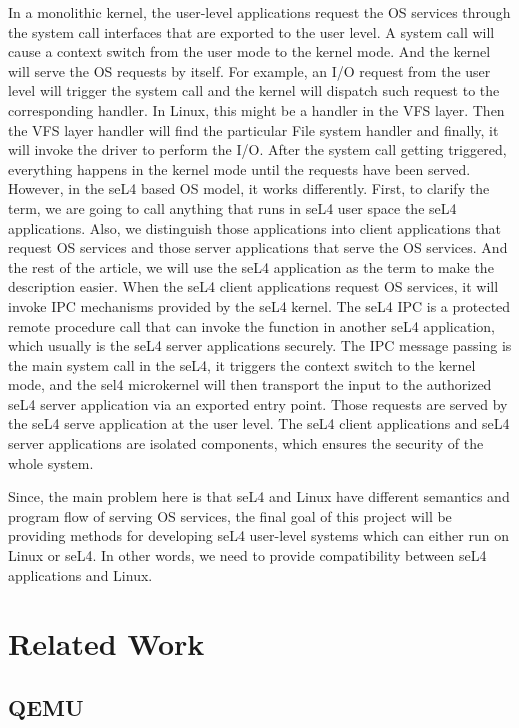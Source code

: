 In a monolithic kernel, the user-level applications request the OS services through the system call interfaces that are exported to the user level. A system call will cause a context switch from the user mode to the kernel mode. And the kernel will serve the OS requests by itself. For example, an I/O request from the user level will trigger the system call and the kernel will dispatch such request to the corresponding handler. In Linux, this might be a handler in the VFS layer. Then the VFS layer handler will find the particular File system handler and finally, it will invoke the driver to perform the I/O. After the system call getting triggered, everything happens in the kernel mode until the requests have been served. However, in the seL4 based OS model, it works differently. First, to clarify the term, we are going to call anything that runs in seL4 user space the seL4 applications. Also, we distinguish those applications into client applications that request OS  services and those server applications that serve the OS services. And the rest of the article, we will use the seL4 application as the term to make the description easier. When the seL4 client applications request OS services, it will invoke IPC mechanisms provided by the seL4 kernel. The seL4 IPC is a protected remote procedure call that can invoke the function in another seL4 application, which usually is the seL4 server applications securely. The IPC message passing is the main system call in the seL4, it triggers the context switch to the kernel mode, and the sel4 microkernel will then transport the input to the authorized seL4 server application via an exported entry point. Those requests are served by the seL4 serve application at the user level.
The seL4 client applications and seL4 server applications are isolated components, which ensures the security of the whole system.

Since, the main problem here is that seL4 and Linux have different semantics and program flow of serving OS services, the final goal of this project will be providing methods for developing seL4 user-level systems which can either run on Linux or seL4. In other words, we need to provide compatibility between seL4 applications and Linux.

\section{Related Work}

\subsection{QEMU}

